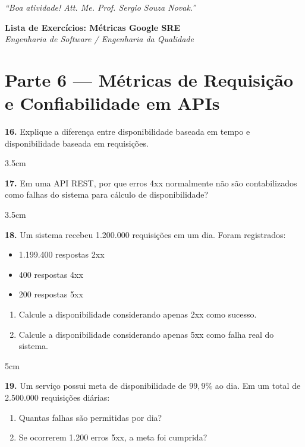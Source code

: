 \documentclass[12pt,a4paper]{report}
\begin{document}
\vspace{1cm}

\begin{center}
    \textit{“Boa atividade! Att. Me. Prof. Sergio Souza Novak.”}
\end{center}

\begin{center}
  {\Large \textbf{Lista de Exercícios: Métricas Google SRE}}\\[0.2cm]
  \textit{Engenharia de Software / Engenharia da Qualidade}
\end{center}

\vspace{0.4cm}

\section*{Parte 6 — Métricas de Requisição e Confiabilidade em APIs}

\textbf{16.} Explique a diferença entre disponibilidade baseada em tempo e disponibilidade baseada em requisições.
\begin{resposta}{3.5cm}
\end{resposta}

\textbf{17.} Em uma API REST, por que erros 4xx normalmente não são contabilizados como falhas do sistema para cálculo de disponibilidade?
\begin{resposta}{3.5cm}
\end{resposta}

\textbf{18.} Um sistema recebeu 1.200.000 requisições em um dia. 
Foram registrados:
\begin{itemize}
    \item 1.199.400 respostas 2xx
    \item 400 respostas 4xx
    \item 200 respostas 5xx
\end{itemize}

\begin{enumerate}[label=\alph*)]
    \item Calcule a disponibilidade considerando apenas 2xx como sucesso.
    \item Calcule a disponibilidade considerando apenas 5xx como falha real do sistema.
\end{enumerate}

\begin{resposta}{5cm}
\end{resposta}

\textbf{19.} Um serviço possui meta de disponibilidade de $99,9\%$ ao dia. 
Em um total de 2.500.000 requisições diárias:
\begin{enumerate}[label=\alph*)]
    \item Quantas falhas são permitidas por dia?
    \item Se ocorrerem 1.200 erros 5xx, a meta foi cumprida?
\end{enumerate}
\end{document}

